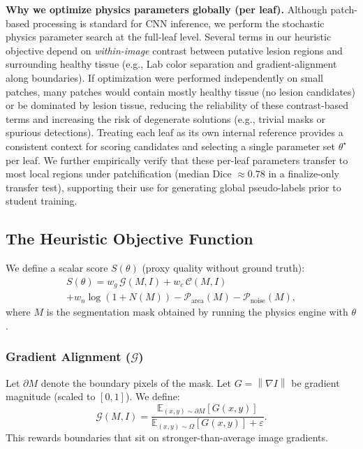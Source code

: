 \documentclass[11pt,a4paper]{article}
\newcommand{\E}{\mathbb{E}}
\newcommand{\grad}{\nabla}
\newcommand{\norm}[1]{\left\lVert #1 \right\rVert}
\begin{document}
\textbf{Why we optimize physics parameters globally (per leaf).}
Although patch-based processing is standard for CNN inference, we perform the stochastic physics parameter search at the full-leaf level. Several terms in our heuristic objective depend on \emph{within-image} contrast between putative lesion regions and surrounding healthy tissue (e.g., Lab color separation and gradient-alignment along boundaries). If optimization were performed independently on small patches, many patches would contain mostly healthy tissue (no lesion candidates) or be dominated by lesion tissue, reducing the reliability of these contrast-based terms and increasing the risk of degenerate solutions (e.g., trivial masks or spurious detections). Treating each leaf as its own internal reference provides a consistent context for scoring candidates and selecting a single parameter set $\theta^\star$ per leaf. We further empirically verify that these per-leaf parameters transfer to most local regions under patchification (median Dice $\approx 0.78$ in a finalize-only transfer test), supporting their use for generating global pseudo-labels prior to student training.

\subsection{The Heuristic Objective Function}
\label{sec:objective}
We define a scalar score $S(\theta)$ (proxy quality without ground truth):
\begin{multline}
S(\theta) = w_g \,\mathcal{G}(M,I) + w_c \,\mathcal{C}(M,I) \\
            + w_n \log(1{+}N(M))
            - \mathcal{P}_{\mathrm{area}}(M) - \mathcal{P}_{\mathrm{noise}}(M),
\label{eq:objective}
\end{multline}
where $M$ is the segmentation mask obtained by running the physics engine with $\theta$.

\subsubsection{Gradient Alignment ($\mathcal{G}$)}
Let $\partial M$ denote the boundary pixels of the mask. Let $G=\norm{\grad I}$ be gradient magnitude (scaled to $[0,1]$). We define:
\begin{equation}
\mathcal{G}(M,I) = \frac{\E_{(x,y)\sim \partial M}[G(x,y)]}{\E_{(x,y)\sim \Omega}[G(x,y)] + \varepsilon}.
\end{equation}
This rewards boundaries that sit on stronger-than-average image gradients.
\end{document}
